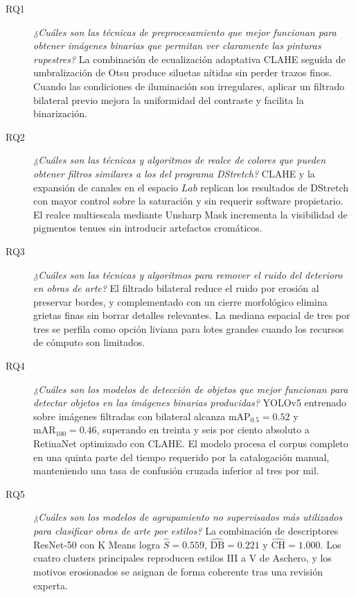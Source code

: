 \begin{description}
  \item[RQ1] \emph{¿Cuáles son las técnicas de preprocesamiento que mejor funcionan para obtener imágenes binarias que permitan ver claramente las pinturas rupestres?}
             La combinación de ecualización adaptativa CLAHE seguida de umbralización de Otsu produce siluetas nítidas sin perder trazos finos.
             Cuando las condiciones de iluminación son irregulares, aplicar un filtrado bilateral previo mejora la uniformidad del contraste y facilita la binarización.

  \item[RQ2] \emph{¿Cuáles son las técnicas y algoritmos de realce de colores que pueden obtener filtros similares a los del programa DStretch?}
             CLAHE y la expansión de canales en el espacio \(\textit{L}\!a\!b\) replican los resultados de DStretch con mayor control sobre la saturación y sin requerir software propietario.
             El realce multiescala mediante Unsharp Mask incrementa la visibilidad de pigmentos tenues sin introducir artefactos cromáticos.

  \item[RQ3] \emph{¿Cuáles son las técnicas y algoritmos para remover el ruido del deterioro en obras de arte?}
             El filtrado bilateral reduce el ruido por erosión al preservar bordes, y complementado con un cierre morfológico elimina grietas finas sin borrar detalles relevantes.
             La mediana espacial de tres por tres se perfila como opción liviana para lotes grandes cuando los recursos de cómputo son limitados.

  \item[RQ4] \emph{¿Cuáles son los modelos de detección de objetos que mejor funcionan para detectar objetos en las imágenes binarias producidas?}
             YOLOv5 entrenado sobre imágenes filtradas con bilateral alcanza \(\mathrm{mAP}_{0.5}=0.52\) y \(\mathrm{mAR}_{100}=0.46\), superando en treinta y seis por ciento absoluto a RetinaNet optimizado con CLAHE.
             El modelo procesa el corpus completo en una quinta parte del tiempo requerido por la catalogación manual, manteniendo una tasa de confusión cruzada inferior al tres por mil.

  \item[RQ5] \emph{¿Cuáles son los modelos de agrupamiento no supervisados más utilizados para clasificar obras de arte por estilos?}
             La combinación de descriptores ResNet-50 con K Means logra \(\widehat{S}=0.559\), \(\widehat{\mathrm{DB}}=0.221\) y \(\widehat{\mathrm{CH}}=1.000\).
             Los cuatro clusters principales reproducen estilos III a V de Aschero, y los motivos erosionados se asignan de forma coherente tras una revisión experta.
\end{description}

